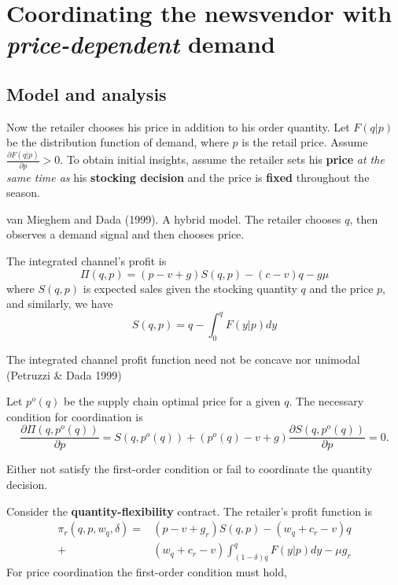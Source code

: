 \newpage
{}
\newcommand{\spq}{S(q,p^o(q))}
\newcommand{\pq}{p^o(q)}
\thispagestyle{empty}
\section{Coordinating the newsvendor with \textit{price-dependent} demand}


\subsection{Model and analysis}
Now the retailer chooses his price in addition to his order quantity. Let $F(q|p)$ be the distribution function of demand, where $p$ is the retail price. Assume $\frac{\partial F(q|p)}{\partial p}>0$. To obtain initial insights, assume the retailer sets his \textbf{price} \textit{at the same time as} his \textbf{stocking decision} and the price is \textbf{fixed} throughout the season.
\begin{note}
    van Mieghem and Dada (1999). A hybrid model. The retailer chooses $q$, then observes a demand signal and then chooses price.
\end{note}

The integrated channel's profit is 
\begin{equation*}
    \Pi(q,p)=(p-v+g)S(q,p)-(c-v)q-g\mu
\end{equation*}
where $S(q,p)$ is expected sales given the stocking quantity $q$ and the price $p$, and similarly, we have
\begin{equation*}
    S(q,p)=q-\int_0^q F(y|p)dy
\end{equation*}
\begin{note}
    The integrated channel profit function need not be concave nor unimodal (Petruzzi \& Dada 1999)
\end{note}
Let $\pq$ be the supply chain optimal price for a given $q$. The necessary condition for coordination is
\begin{equation}\label{eq:3.1}
    \frac{\partial\Pi(q,p^o(q))}{\partial p}=S(q,p^o(q))+(p^o(q)-v+g)\frac{\partial S(q,p^o(q))}{\partial p}=0.
\end{equation}
\begin{note}
    Either not satisfy the first-order condition or fail to coordinate the quantity decision.
\end{note}

Consider the \textbf{quantity-flexibility} contract. The retailer's profit function is 
\begin{align*}
    \pi_r(q,p,w_q,\delta)=&(p-v+g_r)S(q,p)-(w_q+c_r-v)q\\
    +&(w_q+c_r-v)\int_{(1-\delta)q}^q F(y|p)dy-\mu g_r
\end{align*}
For price coordination the first-order condition must hold,

